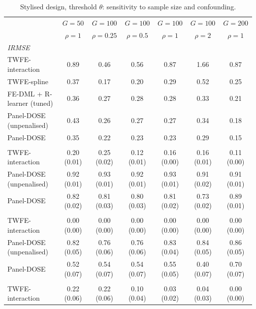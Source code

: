 \documentclass[preprint,12pt,authoryear]{elsarticle}
\begin{document}
\begin{table}[!ht]
\centering
\begin{threeparttable}
\caption{Stylised design, threshold $\theta$: sensitivity to sample size and confounding.}\label{tab:simsens}
\scriptsize
\setlength{\tabcolsep}{3pt}
\begin{tabular}{lcccccc}
\toprule
 & $G=50$ & $G=100$ & $G=100$ & $G=100$ & $G=100$ & $G=200$\\
 & $\rho=1$ & $\rho=0.25$ & $\rho=0.5$ & $\rho=1$ & $\rho=2$ & $\rho=1$\\
\midrule
\multicolumn{7}{l}{\textit{IRMSE}}\\
\quad TWFE-interaction & 0.89 & 0.46 & 0.56 & 0.87 & 1.66 & 0.87\\
\quad TWFE-spline & 0.37 & 0.17 & 0.20 & 0.29 & 0.52 & 0.25\\
\quad FE-DML + R-learner (tuned) & 0.36 & 0.27 & 0.28 & 0.28 & 0.33 & 0.21\\
\quad Panel-DOSE (unpenalised) & 0.43 & 0.26 & 0.27 & 0.27 & 0.34 & 0.18\\
\quad Panel-DOSE & 0.35 & 0.22 & 0.23 & 0.23 & 0.29 & 0.15\\
\addlinespace\multicolumn{7}{l}{\textit{Pointwise coverage}}\\
\quad TWFE-interaction & 0.20 (0.01) & 0.25 (0.02) & 0.12 (0.01) & 0.16 (0.00) & 0.16 (0.01) & 0.11 (0.00)\\
\quad Panel-DOSE (unpenalised) & 0.92 (0.01) & 0.93 (0.01) & 0.92 (0.01) & 0.93 (0.01) & 0.91 (0.02) & 0.91 (0.01)\\
\quad Panel-DOSE & 0.82 (0.02) & 0.81 (0.03) & 0.80 (0.03) & 0.81 (0.02) & 0.73 (0.02) & 0.89 (0.01)\\
\addlinespace\multicolumn{7}{l}{\textit{Simultaneous coverage}}\\
\quad TWFE-interaction & 0.00 (0.00) & 0.00 (0.00) & 0.00 (0.00) & 0.00 (0.00) & 0.00 (0.00) & 0.00 (0.00)\\
\quad Panel-DOSE (unpenalised) & 0.82 (0.05) & 0.76 (0.06) & 0.76 (0.06) & 0.83 (0.04) & 0.84 (0.05) & 0.86 (0.05)\\
\quad Panel-DOSE & 0.52 (0.07) & 0.54 (0.07) & 0.54 (0.07) & 0.55 (0.05) & 0.40 (0.07) & 0.70 (0.07)\\
\addlinespace\multicolumn{7}{l}{\textit{Coverage of high--low contrast}}\\
\quad TWFE-interaction & 0.22 (0.06) & 0.22 (0.06) & 0.10 (0.04) & 0.03 (0.02) & 0.04 (0.03) & 0.00 (0.00)\\

\end{tabular}
\end{threeparttable}
\end{table}
\end{document}
